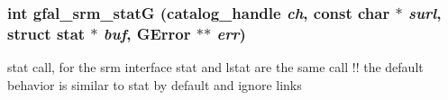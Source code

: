 \subsubsection{\setlength{\rightskip}{0pt plus 5cm}int gfal\_\-srm\_\-stat\-G (catalog\_\-handle {\em ch}, const char $\ast$ {\em surl}, struct stat $\ast$ {\em buf}, GError $\ast$$\ast$ {\em err})}\label{gfal__common__srm__stat_8c_5073234723ab7d40a031a9493a9cf8e6}


stat call, for the srm interface stat and lstat are the same call !! the default behavior is similar to stat by default and ignore links 